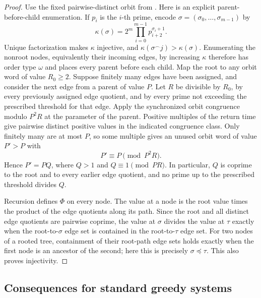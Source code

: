 \begin{proof}
  Use the fixed pairwise-distinct orbit from
  . Here is an explicit
  parent-before-child enumeration. If \(p_i\) is the \(i\)-th prime, encode
  \(\sigma=(\sigma_0,\ldots,\sigma_{m-1})\) by
  \[
    \kappa(\sigma)=2^m\prod_{i=0}^{m-1}p_{i+2}^{\sigma_i+1}.
  \]
  Unique factorization makes \(\kappa\) injective, and
  \(\kappa(\sigma^\frown j)>\kappa(\sigma)\). Enumerating the nonroot
  nodes, equivalently their incoming edges, by increasing \(\kappa\)
  therefore has order type \(\omega\) and places every parent before each
  child. Map
  the root to any orbit word of value \(R_0\ge2\). Suppose finitely many
  edges have been assigned, and consider the next edge from a parent of
  value \(P\). Let \(R\) be divisible by \(R_0\), by every previously
  assigned edge quotient, and by every prime not exceeding the prescribed
  threshold for that edge. Apply the synchronized orbit congruence
  modulo \(P^2R\) at the parameter of the parent. Positive multiples of
  the return time give pairwise distinct positive values in the indicated
  congruence class. Only finitely many are at most \(P\), so some multiple
  gives an unused orbit word of value \(P'>P\) with
  \[
    P'\equiv P\pmod {P^2R}.
  \]
  Hence \(P'=PQ\), where \(Q>1\) and \(Q\equiv1\pmod {PR}\). In
  particular, \(Q\) is coprime to the root and to every earlier edge
  quotient, and no prime up to the prescribed threshold divides \(Q\).

  Recursion defines \(\Phi\) on every node. The value at a node is the
  root value times the product of the edge quotients along its path.
  Since the root and all distinct edge quotients are pairwise coprime,
  the value at \(\sigma\) divides the value at \(\tau\) exactly when the
  root-to-\(\sigma\) edge set is contained in the root-to-\(\tau\) edge
  set. For two nodes of a rooted tree, containment of their root-path edge
  sets holds exactly when the first node is an ancestor of the second;
  here this is precisely \(\sigma\preceq\tau\). This also proves injectivity.
\end{proof}

\subsection{Consequences for standard greedy systems}

